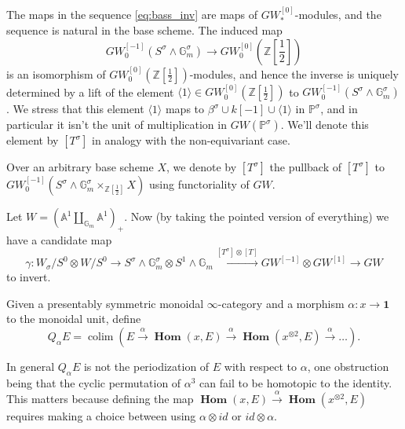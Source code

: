\documentclass[draftthesis,tocnosub,noragright,centerchapter,10pt]{uiucthesis2009}
\newcommand{\Z}{\mathbb Z}
\newcommand{\mbb}{\mathbb}
\DeclareMathOperator*{\colim}{colim}
\DeclareMathOperator{\iHom}{\mathbf{Hom}}
\theoremstyle{plain}
\theoremstyle{definition}
\begin{document}
The maps in the sequence
  \eqref{eq:bass_inv} are maps of $GW^{[0]}_*$-modules, and the
  sequence is natural in the base scheme. The induced map
\[
GW^{[-1]}_0(S^\sigma \wedge \mbb G_m^\sigma) \rightarrow GW^{[0]}_0(\Z[\frac{1}{2}])
\]
is an isomorphism of $GW^{[0]}_0(\Z[\frac{1}{2}])$-modules, and hence
the inverse is uniquely determined by a lift of the element $\langle 1 \rangle
\in GW^{[0]}_0(\Z[\frac{1}{2}])$ to $GW^{[-1]}_0(S^\sigma \wedge \mbb
G_m^\sigma)$. We stress that this element $\langle 1 \rangle$ maps to
$\beta^\sigma \cup k[-1] \cup \langle 1 \rangle$ in $\mbb P^\sigma$,
and in particular it isn't the unit of multiplication in $GW(\mbb P^\sigma)$. We'll denote this element by $[T^\sigma]$ in analogy with
the non-equivariant case.  

Over an arbitrary base scheme $X$, we denote by $[T^\sigma]$ the pullback of
$[T^\sigma]$ to $GW^{[-1]}_0(S^\sigma \wedge \mbb G_m^\sigma
\times_{\Z[\frac{1}{2}]} X)$ using functoriality of $GW$. 

Let $W = (\mbb A^1 \coprod_{\mbb G_m} \mbb A^1)_+$. Now (by taking the pointed version of everything) we have a candidate map
\[
\gamma : W_\sigma/S^0 \otimes W/S^0 \rightarrow
S^\sigma \wedge \mbb G_m^\sigma \otimes S^1 \wedge \mbb G_m
\xrightarrow{[T^\sigma] \otimes [T]}
GW^{[-1]} \otimes GW^{[1]} \rightarrow GW
\]
to invert. 


Given a presentably symmetric monoidal $\infty$-category and a
morphism $\alpha : x \rightarrow \mathbf{1}$ to the monoidal unit,
define 
\[
Q_\alpha E = \colim(E \xrightarrow{\alpha} \iHom(x,E)
\xrightarrow{\alpha} \iHom(x^{\otimes 2}, E) \xrightarrow{\alpha}
\dots ).
\]

In general $Q_\alpha E$ is not the periodization of $E$ with respect
to $\alpha$, one obstruction being that the cyclic permutation of
$\alpha^3$ can fail to be homotopic to the identity. This matters
because defining the map $\iHom(x,E)
\xrightarrow{\alpha} \iHom(x^{\otimes 2}, E)$ requires making a choice
between using $\alpha \otimes id$ or $id \otimes \alpha$. 


\end{document}
